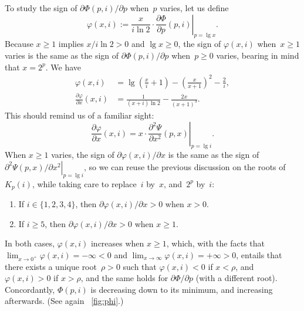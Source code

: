 To study the sign of \(\partial\Phi(p,i)/\partial p\) when~\(p\)
varies, let us define
\begin{equation*}
\varphi(x,i) := \frac{x}{i\ln 2} \cdot
                \left.\frac{\partial\Phi}{\partial
                    p}(p,i)\right|_{p=\lg x}.
\end{equation*}
Because \(x \geqslant 1\) implies \(x/i\ln 2 > 0\) and \(\lg x
\geqslant 0\), the sign of \(\varphi(x,i)\) when~\(x \geqslant 1\)
varies is the same as the sign of \(\partial\Phi(p,i)/\partial p\)
when~\(p \geqslant 0\) varies, bearing in mind that \(x=2^p\). We
have
\begin{align*}
\varphi(x,i) &= \lg\left(\frac{x}{i}+1\right) -
\left(\!\frac{x}{x+1}\!\right)^2 - \frac{2}{i},\\
\frac{\partial\varphi}{\partial x}(x,i) &=
\frac{1}{(x+i)\ln 2} - \frac{2x}{(x+1)^3}.
\end{align*}
This should remind us of a familiar sight:
\begin{equation*}
\frac{\partial\varphi}{\partial x}(x,i) =
  x \cdot \left.\frac{\partial^2\Psi}{\partial x^2}(p,x)\right|_{p=\lg
  i}.
\end{equation*}
When \(x \geqslant 1\) varies, the sign of
\(\partial\varphi(x,i)/\partial x\) is the same as the sign of
\(\left.\partial^2\Psi(p,x)/\partial x^2\right|_{p=\lg i}\), so we can
reuse the previous discussion on the roots of \(K_p(i)\), while taking
care to replace~\(i\) by~\(x\), and~\(2^p\) by~\(i\):
\begin{enumerate}

  \item If \(i \in \{1,2,3,4\}\), then \(\partial\varphi(x,i)/\partial
    x > 0\) when \(x > 0\).

  \item If \(i \geqslant 5\), then \(\partial\varphi(x,i)/\partial x >
    0\) when \(x \geqslant 1\).

\end{enumerate}
In both cases, \(\varphi(x,i)\) increases when \(x \geqslant 1\),
which, with the facts that \(\lim_{x\to 0^{+}}\varphi(x,i) = -\infty <
0\) and \(\lim_{x\to\infty}\varphi(x,i) = +\infty > 0\), entails that
there exists a unique root~\(\rho > 0\) such that \(\varphi(x,i) < 0\)
if \(x < \rho\), and \(\varphi(x,i) > 0\) if \(x > \rho\), and the
same holds for \(\partial\Phi/\partial p\) (with a different
root). Concordantly, \(\Phi(p,i)\) is decreasing down to its minimum,
and increasing afterwards. (See again \fig~\vref{fig:phi}.)

